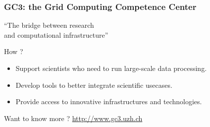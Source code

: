 \documentclass[english,serif,mathserif,usenames,dvipsnames]{beamer}
\begin{document}
\begin{frame}
  
  \frametitle{GC3: the Grid Computing Competence Center}

    
  \begin{block}{}
     \begin{center}
       \large {\color{Blue}``The bridge between research \\ and computational infrastructure''}
     \end{center}
  \end{block} 

  \begin{block}{How ?}
    \begin{itemize}
      \item {\color{Blue}Support} scientists who need to run large-scale data processing. \\
      \item {\color{Blue}Develop} tools to better {\color{Blue}integrate} scientific usecases.
      \item Provide access to {\color{Blue}innovative} infrastructures and technologies. \\
    \end{itemize}
    {\color{Blue}\small{Want to know more ? }\url{http://www.gc3.uzh.ch}}
  \end{block}

\end{frame}
\end{document}
